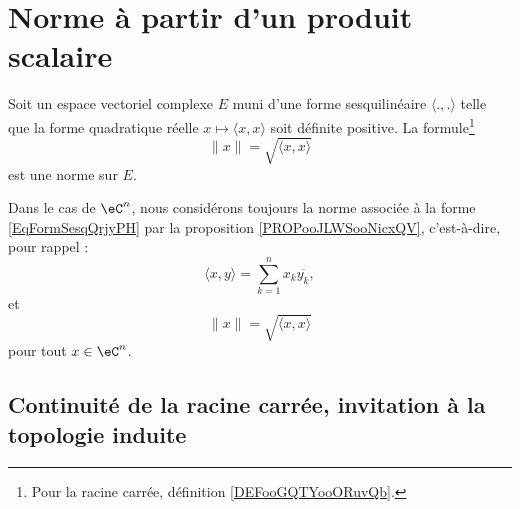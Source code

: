 \section{Norme à partir d'un produit scalaire}

\begin{proposition}            \label{PROPooJLWSooNicxQV}
	Soit un espace vectoriel complexe \( E\) muni d'une forme sesquilinéaire \( \langle ., .\rangle \) telle que la forme quadratique réelle \( x\mapsto\langle x, x \rangle\) soit définite positive. La formule\footnote{Pour la racine carrée, définition \ref{DEFooGQTYooORuvQb}.}
	\begin{equation}        \label{EQooZIXRooMGcsXY}
		\| x \|=  \sqrt{ \langle x, x\rangle }
	\end{equation}
	est une norme sur \( E\).
\end{proposition}

\begin{definition}      \label{DEFooGUXNooXwCsrq}
	Dans le cas de \( \eC^n\), nous considérons toujours la norme associée à la forme \eqref{EqFormSesqQrjyPH} par la proposition \ref{PROPooJLWSooNicxQV}, c'est-à-dire, pour rappel :
	\begin{equation}
		\langle x, y\rangle =\sum_{k=1}^nx_k\overline {y_k},
	\end{equation}
	et
	\begin{equation}
		\| x \|=  \sqrt{ \langle x, x\rangle }
	\end{equation}
	pour tout \( x\in \eC^n\).
\end{definition}

\subsection{Continuité de la racine carrée, invitation à la topologie induite}

